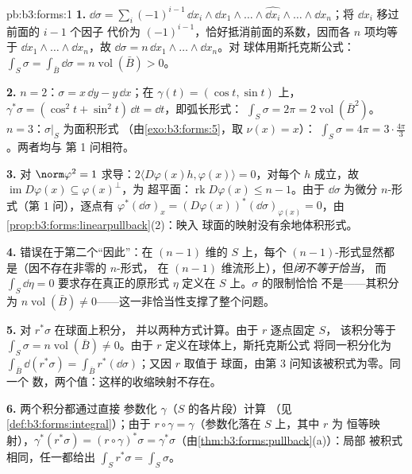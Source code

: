 \begin{solution}{pb:b3:forms:1}
\textbf{1.} $\dd\sigma = \sum_i(-1)^{i-1}\,\dd x_i\wedge\dd
x_1\wedge\dots\wedge\widehat{\dd x_i}\wedge\dots\wedge\dd
x_n$；将 $\dd x_i$ 移过前面的 $i-1$ 个因子
代价为 $(-1)^{i-1}$，恰好抵消前面的系数，因而各
$n$ 项均等于 $\dd x_1\wedge\dots\wedge\dd x_n$，故
$\dd\sigma = n\,\dd x_1\wedge\dots\wedge\dd x_n$。对
球体用斯托克斯公式：$\int_S\sigma = \int_{\bar B}\dd\sigma =
n\operatorname{vol}(\bar B) > 0$。

\textbf{2.} $n = 2$：$\sigma = x\,\dd y - y\,\dd x$；在
$\gamma(t) = (\cos t, \sin t)$ 上，$\gamma^*\sigma = (\cos^2t +
\sin^2t)\,\dd t = \dd t$，即弧长形式：
$\int_S\sigma = 2\pi = 2\operatorname{vol}(\bar B^2)$。
$n = 3$：$\sigma\vert_S$ 为面积形式
（由\cref{exo:b3:forms:5}，取 $\nu(x) = x$）：
$\int_S\sigma = 4\pi = 3\cdot\tfrac{4\pi}3$。两者均与
第 1 问相符。

\textbf{3.} 对 $\norm\varphi^2 = 1$ 求导：$2\langle
D\varphi(x)h, \varphi(x)\rangle = 0$，对每个 $h$ 成立，故
$\operatorname{im}D\varphi(x) \subseteq \varphi(x)^\perp$，为
超平面：$\operatorname{rk}D\varphi(x) \leq n - 1$。由于
$\dd\sigma$ 为微分 $n$-形式（第 1 问），逐点有
$\varphi^*(\dd\sigma)_x =
(D\varphi(x))^*(\dd\sigma)_{\varphi(x)} = 0$，由
\cref{prop:b3:forms:linearpullback}(2)：映入
球面的映射没有余地体积形式。

\textbf{4.} 错误在于第二个“因此”：在
$(n-1)$ 维的 $S$ 上，每个 $(n-1)$-形式显然都
是（因不存在非零的 $n$-形式，
在 $(n-1)$ 维流形上），但\emph{闭不等于恰当}，
而 $\int_S\dd\eta = 0$ 要求存在真正的原形式 $\eta$
定义在 $S$ 上。$\sigma$ 的限制恰恰
不是——其积分为 $n\operatorname{vol}(\bar B) \neq
0$——这一非恰当性支撑了整个问题。

\textbf{5.} 对 $r^*\sigma$ 在球面上积分，
并以两种方式计算。由于 $r$ 逐点固定 $S$，
该积分等于 $\int_S\sigma = n\operatorname{vol}(\bar B)
\neq 0$。由于 $r$ 定义在球体上，斯托克斯公式
将同一积分化为 $\int_{\bar B}\dd(r^*\sigma) =
\int_{\bar B}r^*(\dd\sigma)$；又因 $r$ 取值于
球面，由第 3 问知该被积式为零。同一个
数，两个值：这样的收缩映射不存在。

\textbf{6.} 两个积分都通过直接
参数化 $\gamma$（$S$ 的各片段）计算
（见\cref{def:b3:forms:integral}）；由于 $r\circ\gamma =
\gamma$（参数化落在 $S$ 上，其中 $r$ 为
恒等映射），$\gamma^*(r^*\sigma) = (r\circ\gamma)^*\sigma =
\gamma^*\sigma$（由\cref{thm:b3:forms:pullback}(a)）：局部
被积式相同，任一都给出
$\int_Sr^*\sigma = \int_S\sigma$。


\end{solution}
